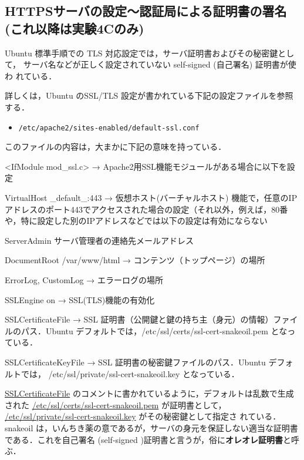 \subsection{HTTPSサーバの設定～認証局による証明書の署名 (これ以降は実験4Cのみ)}

Ubuntu 標準手順での TLS 対応設定では，サーバ証明書およびその秘密鍵として，
サーバ名などが正しく設定されていない self-signed (自己署名) 証明書が使わ
れている．


詳しくは，Ubuntu のSSL/TLS 設定が書かれている下記の設定ファイルを参照する．

\begin{itemize}
    \item \texttt{/etc/apache2/sites-enabled/default-ssl.conf}
\end{itemize}

このファイルの内容は，大まかに下記の意味を持っている．

\begin{cli}
<IfModule mod_ssl.c>
→ Apache2用SSL機能モジュールがある場合に以下を設定

VirtualHost _default_:443
→ 仮想ホスト(バーチャルホスト) 機能で，任意のIPアドレスのポート443でアクセスされた場合の設定（それ以外，例えば，80番や，特に設定した別のIPアドレスなどでは以下の設定は有効にならない

ServerAdmin サーバ管理者の連絡先メールアドレス

DocumentRoot /var/www/html
→ コンテンツ（トップページ）の場所

ErrorLog, CustomLog
→ エラーログの場所

SSLEngine on
→ SSL(TLS)機能の有効化

SSLCertificateFile
→ SSL 証明書（公開鍵と鍵の持ち主（身元）の情報）ファイルのパス．Ubuntu デフォルトでは，/etc/ssl/certs/ssl-cert-snakeoil.pem となっている．

SSLCertificateKeyFile
→ SSL 証明書の秘密鍵ファイルのパス．Ubuntu デフォルトでは，
/etc/ssl/private/ssl-cert-snakeoil.key となっている．

\end{cli}

\url{SSLCertificateFile} のコメントに書かれているように，デフォルトは乱数で生成された 
\url{/etc/ssl/certs/ssl-cert-snakeoil.pem} が証明書として，
\url{/etc/ssl/private/ssl-cert-snakeoil.key} がその秘密鍵として指定さ
れている．snakeoil は，いんちき薬の意であるが，サーバの身元を保証しない適当な証明書である．これを自己署名 (self-signed )証明書と言うが，俗に\textbf{オレオレ証明書}と呼ぶ．

